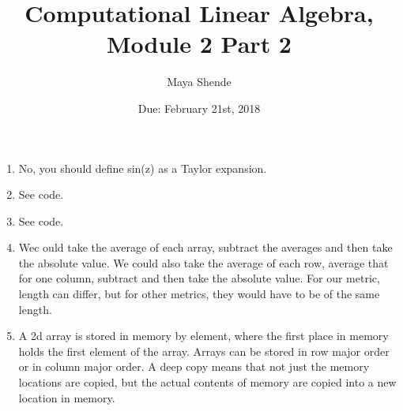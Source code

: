 \documentclass{article}
\title{Computational Linear Algebra, Module 2 Part 2}
\author{Maya Shende}
\date{Due: February 21st, 2018}
\begin{document}
\maketitle

\begin{enumerate}
\item No, you should define sin(z) as a Taylor expansion.

\item See code. 

\item See code.

\item Wec ould take the average of each array, subtract the averages and then 
take the absolute value. We could also take the average of each row, average that for one column, subtract and then take the absolute value. For our metric, length can differ, but for other metrics, they would have to be of the same length. 

\item A 2d array is stored in memory by element, where the first place in memory holds the first element of the array. Arrays can be stored in row major order or in column major order. A deep copy means that not just the memory locations are copied, but the actual contents of memory are copied into a new location in memory. 
\end{enumerate}
\end{document}
